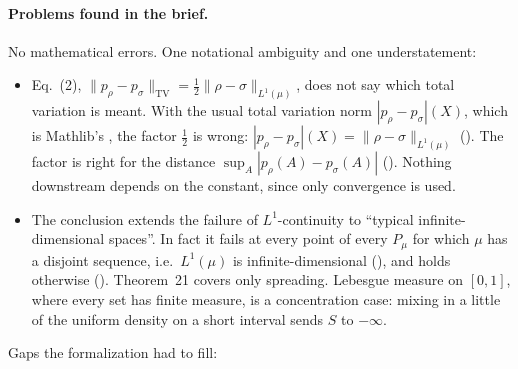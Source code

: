 \documentclass[11pt]{article}
\begin{document}
\paragraph{Problems found in the brief.} No mathematical errors. One notational ambiguity and
one understatement:
\begin{itemize}
\item Eq.~(2), $\|p_\rho - p_\sigma\|_{\mathrm{TV}} = \tfrac12\|\rho - \sigma\|_{L^1(\mu)}$, does
  not say which total variation is meant. With the usual total variation norm
  $|p_\rho - p_\sigma|(X)$, which is Mathlib's , the factor $\tfrac12$ is wrong:
  $|p_\rho - p_\sigma|(X) = \|\rho - \sigma\|_{L^1(\mu)}$ (). The factor is
  right for the distance $\sup_A |p_\rho(A) - p_\sigma(A)|$ ().
  Nothing downstream depends on the constant, since only convergence is used.
\item The conclusion extends the failure of $L^1$-continuity to ``typical infinite-dimensional
  spaces''. In fact it fails at every point of every $P_\mu$ for which $\mu$ has a
  disjoint sequence, i.e.\ $L^1(\mu)$ is infinite-dimensional (),
  and holds otherwise
  (). Theorem~21 covers only spreading. Lebesgue measure on
  $[0, 1]$, where every set has finite measure, is a concentration case: mixing in a little of
  the uniform density on a short interval sends $S$ to $-\infty$.
\end{itemize}
Gaps the formalization had to fill:
\end{document}
